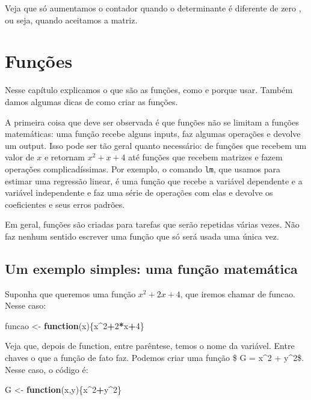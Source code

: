 \documentclass[]{book}
\newenvironment{Shaded}{\begin{snugshade}}{\end{snugshade}}
\newcommand{\DecValTok}[1]{\textcolor[rgb]{0.00,0.00,0.81}{#1}}
\newcommand{\StringTok}[1]{\textcolor[rgb]{0.31,0.60,0.02}{#1}}
\newcommand{\ControlFlowTok}[1]{\textcolor[rgb]{0.13,0.29,0.53}{\textbf{#1}}}
\newcommand{\OperatorTok}[1]{\textcolor[rgb]{0.81,0.36,0.00}{\textbf{#1}}}
\newcommand{\NormalTok}[1]{#1}
\begin{document}
Veja que só aumentamos o contador quando o determinante é diferente de
zero , ou seja, quando aceitamos a matriz.

\chapter{Funções}\label{funcoes}

Nesse capítulo explicamos o que são as funções, como e porque usar.
Também damos algumas dicas de como criar as funções.

A primeira coisa que deve ser observada é que funções não se limitam a
funções matemáticas: uma função recebe alguns inputs, faz algumas
operações e devolve um output. Isso pode ser tão geral quanto
necessário: de funções que recebem um valor de \(x\) e retornam
\(x^2+x+4\) até funções que recebem matrizes e fazem operações
complicadíssimas. Por exemplo, o comando \texttt{lm}, que usamos para
estimar uma regressão linear, é uma função que recebe a variável
dependente e a variável independente e faz uma série de operações com
elas e devolve os coeficientes e seus erros padrões.

Em geral, funções são criadas para tarefas que serão repetidas várias
vezes. Não faz nenhum sentido escrever uma função que só será usada uma
única vez.

\section{Um exemplo simples: uma função
matemática}\label{um-exemplo-simples-uma-funcao-matematica}

Suponha que queremos uma função \(x^2+2x+4\), que iremos chamar de
funcao. Nesse caso:

\begin{Shaded}
\begin{Highlighting}[]
\NormalTok{funcao <-}\StringTok{ }\ControlFlowTok{function}\NormalTok{(x)\{x}\OperatorTok{^}\DecValTok{2}\OperatorTok{+}\DecValTok{2}\OperatorTok{*}\NormalTok{x}\OperatorTok{+}\DecValTok{4}\NormalTok{\}}
\end{Highlighting}
\end{Shaded}

Veja que, depois de function, entre parêntese, temos o nome da variável.
Entre chaves o que a função de fato faz. Podemos criar uma função \$ G =
x\^{}2 + y\^{}2\$. Nesse caso, o código é:

\begin{Shaded}
\begin{Highlighting}[]
\NormalTok{G <-}\StringTok{ }\ControlFlowTok{function}\NormalTok{(x,y)\{x}\OperatorTok{^}\DecValTok{2}\OperatorTok{+}\NormalTok{y}\OperatorTok{^}\DecValTok{2}\NormalTok{\}}
\end{Highlighting}
\end{Shaded}
\end{document}
